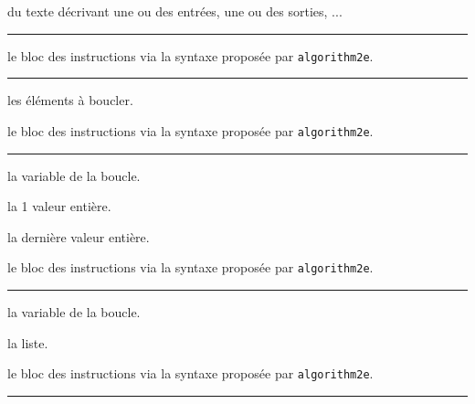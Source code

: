 \documentclass[12pt,a4paper]{article}
\theoremstyle{definition}
\newcommand\separation{
    \medskip
    \hfill\rule{0.5\textwidth}{0.75pt}\hfill
    \medskip
}
\begin{document}




\IDarg{} du texte décrivant une ou des entrées, une ou des sorties, ...




\separation





\IDarg{} le bloc des instructions via la syntaxe proposée par \verb#algorithm2e#.




\separation





 les éléments à boucler.

 le bloc des instructions via la syntaxe proposée par \verb#algorithm2e#.




\separation






 la variable de la boucle.

 la 1\ier{} valeur entière.

 la dernière valeur entière.

 le bloc des instructions via la syntaxe proposée par \verb#algorithm2e#.




\separation





 la variable de la boucle.

 la liste.

 le bloc des instructions via la syntaxe proposée par \verb#algorithm2e#.




\separation



\end{document}
